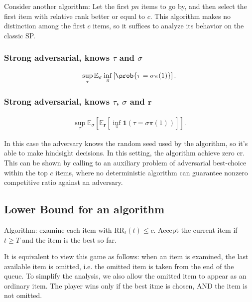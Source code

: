 Consider another algorithm: Let the first $pn$ items to go by, and then select the first item with relative rank better or equal to $c $. This algorithm makes no distinction among the first $c $ items, so it suffices to analyze its behavior on the classic SP. 

\subsubsection{Strong adversarial, knows $\tau $ and $\sigma$}

\begin{align*}
	\sup_\tau  \mathbb{E}_\sigma \inf_\pi \left[ \prob{ 
	\tau = \sigma\pi(1) }   \right] 
.\end{align*}





\subsubsection{Strong adversarial, knows $\tau$,  $\sigma$ and $\mathbf{r}$ }


\begin{align*}
	\sup_\tau  \mathbb{E}_\sigma \left[ \mathbb{E}_{\mathbf{r}} \left[ \inf_\pi  
	\mathbf{1}\left( \tau = \sigma\pi(1) \right)  \right]  \right] 
.\end{align*}

In this case the adversary knows the random seed used by the algorithm, so it's able to make hindsight decisions. In this setting, the algorithm achieve zero cr. This can be shown by calling to an auxiliary problem of adversarial best-choice within the top $c $ items, where no deterministic algorithm can guarantee nonzero competitive ratio against an adversary.


\subsection{Lower Bound for an algorithm}

Algorithm: examine each item with $\text{RR}_t(t) \le  c $. Accept the current item if $t \ge  T $ and the item is the best so far.

It is equivalent to view this game as follows: when an item is examined, the last available item is omitted, i.e. the omitted item is taken from the end of the queue. To simplify the analysis, we also allow the omitted item to appear as an ordinary item. The player wins only if the best itme is chosen, AND the item is not omitted.

